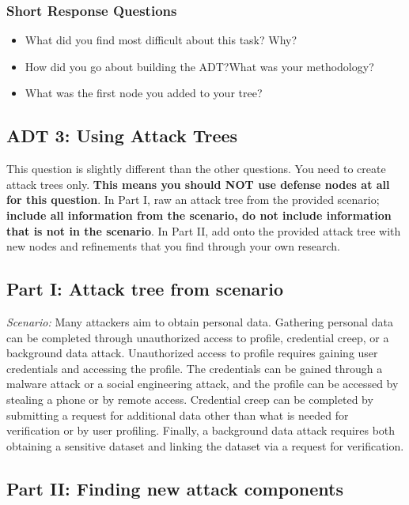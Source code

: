 \subsubsection*{Short Response Questions}
\begin{itemize}
  \setlength{\itemindent}{\qIndent}
  \item[\surveyq{LS-ADT2-W1}] What did you find most difficult about this task? Why?
  \item[\surveyq{LS-ADT2-W2}] How did you go about building the ADT?\@ What was your methodology?
  \item[\surveyq{LS-ADT2-W3}] What was the first node you added to your tree?
\end{itemize}


\subsection*{ADT 3: Using Attack Trees}
This question is slightly different than the other questions. You need to create attack trees only. \textbf{This means you should NOT use defense nodes at all for this question}. In Part I, raw an attack tree from the provided scenario; \textbf{include all information from the scenario, do not include information that is not in the scenario}. In Part II, add onto the provided attack tree with new nodes and refinements that you find through your own research.

\subsection*{Part I: Attack tree from scenario}

\emph{Scenario:}  Many attackers aim to obtain personal data. Gathering personal data can be completed through unauthorized access to profile, credential creep, or a background data attack. Unauthorized access to profile requires gaining user credentials and accessing the profile. The credentials can be gained through a malware attack or a social engineering attack, and the profile can be accessed by stealing a phone or by remote access. Credential creep can be completed by submitting a request for additional data other than what is needed for verification or by user profiling. Finally, a background data attack requires both obtaining a sensitive dataset and linking the dataset via a request for verification. 


\subsection*{Part II: Finding new attack components}

